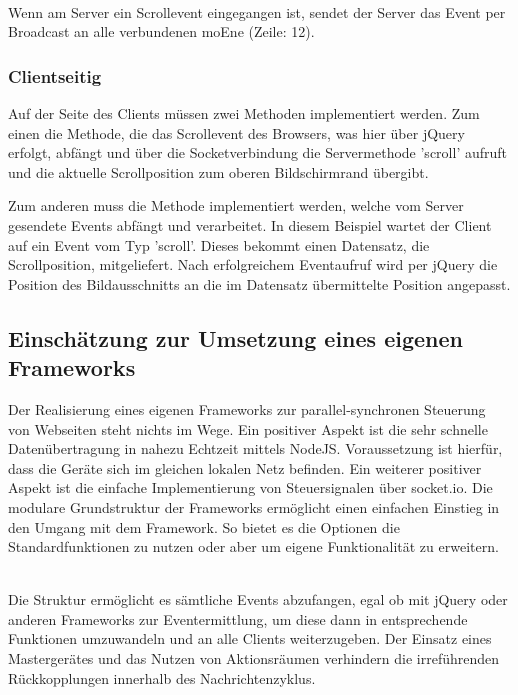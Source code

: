 	\\Wenn am Server ein Scrollevent eingegangen ist, sendet der Server das Event per Broadcast an alle verbundenen \Gls{moEn}e (Zeile: 12).
	
	\subsubsection{Clientseitig}
	Auf der Seite des Clients müssen zwei Methoden implementiert werden. Zum einen die Methode, die das Scrollevent des Browsers, was hier über jQuery erfolgt, abfängt und über die Socketverbindung die Servermethode 'scroll' aufruft und die aktuelle Scrollposition zum oberen Bildschirmrand übergibt.
	
	
	Zum anderen muss die Methode implementiert werden, welche vom Server gesendete \Gls{Event}s abfängt und verarbeitet. In diesem Beispiel wartet der Client auf ein \Gls{Event} vom Typ 'scroll'. Dieses bekommt einen Datensatz, die Scrollposition, mitgeliefert. Nach erfolgreichem \Gls{Event}aufruf wird per jQuery die Position des Bildausschnitts an die im Datensatz übermittelte Position angepasst.
	

	\subsection{Einschätzung zur Umsetzung eines eigenen \Gls{Framework}s}
	Der Realisierung eines eigenen \Gls{Framework}s zur \gls{parallel-synchron}en Steuerung von Webseiten steht nichts im Wege. Ein positiver Aspekt ist die sehr schnelle Datenübertragung in nahezu Echtzeit mittels \gls{NodeJS}. Voraussetzung ist hierfür, dass die Geräte sich im gleichen lokalen Netz befinden. Ein weiterer positiver Aspekt ist die einfache Implementierung von Steuersignalen über socket.io. Die modulare Grundstruktur der \Gls{Framework}s ermöglicht einen einfachen Einstieg in den Umgang mit dem \Gls{Framework}. So bietet es die Optionen die Standardfunktionen zu nutzen oder aber um eigene Funktionalität zu erweitern.

\\Die Struktur ermöglicht es sämtliche \Gls{Event}s abzufangen, egal ob mit jQuery oder anderen \Gls{Framework}s zur \Gls{Event}ermittlung, um diese dann in entsprechende Funktionen umzuwandeln und an alle Clients weiterzugeben. Der Einsatz eines Mastergerätes und das Nutzen von Aktionsräumen verhindern die irreführenden Rückkopplungen innerhalb des Nachrichtenzyklus. 

